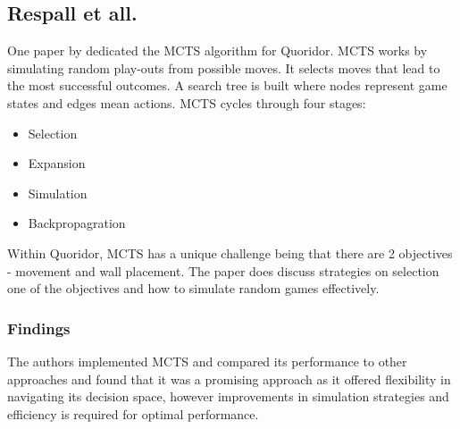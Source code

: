\documentclass[review]{cmpreport}
\begin{document}
\subsection{Respall et all.}

One paper by \cite{respall2018monte} dedicated the MCTS algorithm for Quoridor. MCTS works by simulating random play-outs from possible moves. It selects moves that lead to the most successful outcomes. A search tree is built where nodes represent game states and edges mean actions. MCTS cycles through four stages:
\begin{itemize}
    \item Selection
    \item Expansion
    \item Simulation
    \item Backpropagration
\end{itemize}

Within Quoridor, MCTS has a unique challenge being that there are 2 objectives - movement and wall placement. The paper does discuss strategies on selection one of the objectives and how to simulate random games effectively. 

\subsubsection{Findings}
The authors implemented MCTS and compared its performance to other approaches and found that it was a promising approach as it offered flexibility in navigating its decision space, however improvements in simulation strategies and efficiency is required for optimal performance.


\end{document}
